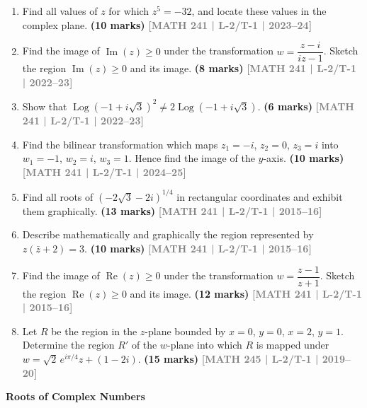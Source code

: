 \documentclass[12pt,a4paper]{article}
\newcommand{\yr}[1]{\hfill\textcolor{gray}{\small\textbf{[#1]}}}
\newcommand{\mk}[1]{\textcolor{orange!70!black}{\small\textbf{(#1 marks)}}}
\newcommand{\subtopic}[2]{%
  \vspace{10pt}
  \noindent\begin{tcolorbox}[colback=#1!8,colframe=#1,boxrule=0.6pt,arc=4pt,
    left=6pt,right=6pt,top=4pt,bottom=4pt]
    \small\bfseries\textcolor{#1}{#2}
  \end{tcolorbox}
  \vspace{2pt}
}
\begin{document}
\begin{enumerate}
\item Find all values of $z$ for which $z^{5}=-32$, and locate these values in the complex plane.
\mk{10} \yr{MATH 241 | L-2/T-1 | 2023--24}

\item Find the image of $\operatorname{Im}(z)\ge 0$ under the transformation $w=\dfrac{z-i}{iz-1}$. Sketch the region $\operatorname{Im}(z)\ge 0$ and its image.
\mk{8} \yr{MATH 241 | L-2/T-1 | 2022--23}

\item Show that $\operatorname{Log}(-1+i\sqrt{3})^{2}\neq 2\operatorname{Log}(-1+i\sqrt{3})$.
\mk{6} \yr{MATH 241 | L-2/T-1 | 2022--23}

\item Find the bilinear transformation which maps $z_{1}=-i$, $z_{2}=0$, $z_{3}=i$ into $w_{1}=-1$, $w_{2}=i$, $w_{3}=1$. Hence find the image of the $y$-axis.
\mk{10} \yr{MATH 241 | L-2/T-1 | 2024--25}

\item Find all roots of $(-2\sqrt{3}-2i)^{1/4}$ in rectangular coordinates and exhibit them graphically.
\mk{13} \yr{MATH 241 | L-2/T-1 | 2015--16}

\item Describe mathematically and graphically the region represented by $z(\bar{z}+2)=3$.
\mk{10} \yr{MATH 241 | L-2/T-1 | 2015--16}

\item Find the image of $\operatorname{Re}(z)\ge 0$ under the transformation $w=\dfrac{z-1}{z+1}$. Sketch the region $\operatorname{Re}(z)\ge 0$ and its image.
\mk{12} \yr{MATH 241 | L-2/T-1 | 2015--16}

\item Let $R$ be the region in the $z$-plane bounded by $x=0$, $y=0$, $x=2$, $y=1$. Determine the region $R'$ of the $w$-plane into which $R$ is mapped under $w=\sqrt{2}\,e^{i\pi/4}z+(1-2i)$.
\mk{15} \yr{MATH 245 | L-2/T-1 | 2019--20}

\end{enumerate}

\subtopic{cE}{Roots of Complex Numbers}
\label{sub:s5-roots}
\end{document}
